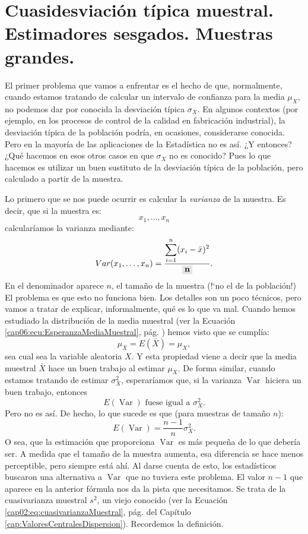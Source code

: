 \section{Cuasidesviación típica muestral. Estimadores sesgados. Muestras grandes. }
\label{cap06:sec:DesviacionTipicaMuestral}

El primer problema que vamos a enfrentar es el hecho de que, normalmente,
cuando estamos tratando de calcular un intervalo de confianza para la media
$\mu_X$, no podemos dar por conocida la desviación típica $\sigma_X$. En
algunos contextos (por ejemplo, en los procesos de control de la calidad en
fabricación industrial), la desviación típica de la población podría, en
ocasiones, considerarse conocida. Pero en la mayoría de las aplicaciones de la
Estadística no es así. ¿Y entonces? ¿Qué hacemos en esos otros casos en que
$\sigma_X$ no es conocido? Pues lo que hacemos es utilizar un buen sustituto de
la desviación típica de la población, pero calculado a partir de la muestra.

Lo primero que se nos puede ocurrir es calcular la {\em varianza} de la
muestra. Es decir, que si la muestra es:
    \[x_1,\ldots,x_n\]
calcularíamos la varianza mediante:
    \[Var(x_1,\ldots,x_n)=\dfrac{\displaystyle\sum_{i=1}^n(x_i-\bar x)^2}{\colorbox{lightgrey}{\bf n}}.\]
En el denominador aparece $n$, el tamaño de la muestra ({!`}no el de la
población!) El problema es que esto no funciona bien. Los detalles son un poco
técnicos, pero vamos a tratar de explicar, informalmente, qué es lo que va mal.
Cuando hemos estudiado la distribución de la media muestral (ver la Ecuación
\ref{cap06:ecu:EsperanzaMediaMuestral}, pág.
\pageref{cap06:ecu:EsperanzaMediaMuestral}) hemos visto que se cumplía:
\[\mu_{\bar X}=E(\bar X)=\mu_X,\]
sea cual sea la variable aleatoria $X$. Y esta propiedad viene a decir que la
media muestral $\bar X$ hace un buen trabajo al estimar $\mu_X$. De forma
similar, cuando estamos tratando de estimar $\sigma^2_X$, esperaríamos que, si
la varianza $\operatorname{Var}$ hiciera un buen trabajo, entonces
\[E(\operatorname{Var}) \mbox{ fuese igual a } \sigma^2_X.\]
Pero no es así. De hecho, lo que sucede es que (para muestras de tamaño $n$):
\[E(\operatorname{Var})=\dfrac{n-1}{n}\sigma^2_X.\]
O sea, que la estimación que proporciona $\operatorname{Var}$ es más pequeña de
lo que debería ser. A medida que el tamaño de la muestra aumenta, esa
diferencia se hace menos perceptible, pero siempre está ahí. Al darse cuenta de
esto, los estadísticos buscaron una alternativa a $\operatorname{Var}$ que no
tuviera este problema. El valor $n-1$ que aparece en la anterior fórmula nos da
la pista que necesitamos. Se trata de la {\sf cuasivarianza muestral} $s^2$, un
viejo conocido (ver la Ecuación \ref{cap02:eq:cuasivarianzaMuestral}, pág.
\pageref{cap02:eq:cuasivarianzaMuestral} del Capítulo
\ref{cap:ValoresCentralesDispersion}). Recordemos la definición.


